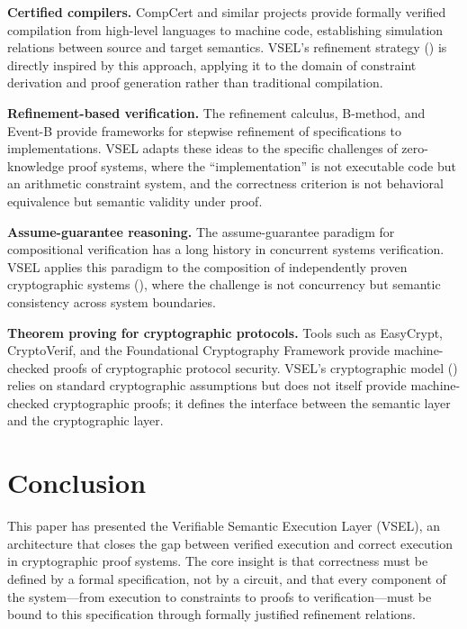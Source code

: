 \documentclass[11pt,a4paper]{article}
\theoremstyle{definition}
\begin{document}
\noindent\textbf{Certified compilers.} CompCert and similar projects provide formally verified compilation from high-level languages to machine code, establishing simulation relations between source and target semantics. VSEL's refinement strategy () is directly inspired by this approach, applying it to the domain of constraint derivation and proof generation rather than traditional compilation.

\noindent\textbf{Refinement-based verification.} The refinement calculus, B-method, and Event-B provide frameworks for stepwise refinement of specifications to implementations. VSEL adapts these ideas to the specific challenges of zero-knowledge proof systems, where the ``implementation'' is not executable code but an arithmetic constraint system, and the correctness criterion is not behavioral equivalence but semantic validity under proof.

\noindent\textbf{Assume-guarantee reasoning.} The assume-guarantee paradigm for compositional verification has a long history in concurrent systems verification. VSEL applies this paradigm to the composition of independently proven cryptographic systems (), where the challenge is not concurrency but semantic consistency across system boundaries.

\noindent\textbf{Theorem proving for cryptographic protocols.} Tools such as EasyCrypt, CryptoVerif, and the Foundational Cryptography Framework provide machine-checked proofs of cryptographic protocol security. VSEL's cryptographic model () relies on standard cryptographic assumptions but does not itself provide machine-checked cryptographic proofs; it defines the interface between the semantic layer and the cryptographic layer.

\section{Conclusion}
\label{sec:conclusion}

This paper has presented the Verifiable Semantic Execution Layer (VSEL), an architecture that closes the gap between verified execution and correct execution in cryptographic proof systems. The core insight is that correctness must be defined by a formal specification, not by a circuit, and that every component of the system---from execution to constraints to proofs to verification---must be bound to this specification through formally justified refinement relations.
\end{document}

